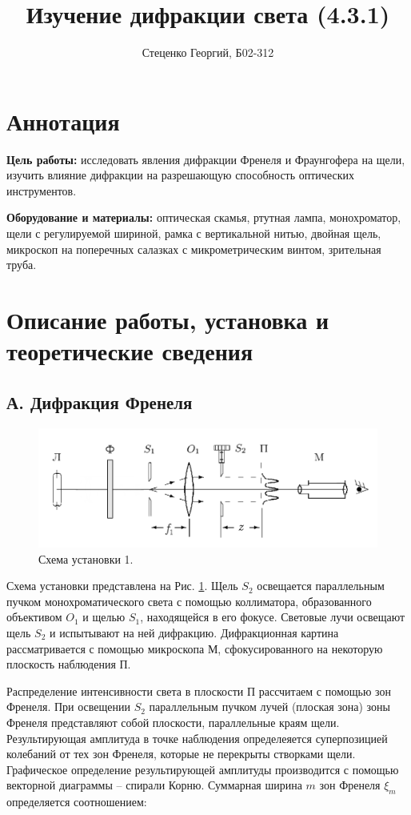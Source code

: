 \documentclass[12pt, a4paper]{article}
\title{Изучение дифракции света (4.3.1)}
\author{Стеценко Георгий, Б02-312}
\date{}
\begin{document}
\maketitle

\section{Аннотация}
\textbf{Цель работы:} исследовать явления дифракции Френеля и Фраунгофера
на щели, изучить влияние дифракции на разрешающую способность оптических
инструментов.

\textbf{Оборудование и материалы:} оптическая скамья, ртутная лампа, монохроматор,
щели с регулируемой шириной, рамка с вертикальной нитью, двойная щель,
микроскоп на поперечных салазках с микрометрическим винтом, зрительная
труба.

\section{Описание работы, установка и теоретические сведения}
\subsection*{А. Дифракция Френеля}
\begin{figure}[h]
  \includegraphics[width=0.7\linewidth]{pics/0.png}
  \centering
  \caption{Схема установки 1.}
  \label{pic:setup-1}
\end{figure}

Схема установки представлена на Рис. \ref{pic:setup-1}.
Щель $S_2$ освещается параллельным пучком монохроматического света с помощью коллиматора,
образованного объективом $O_1$ и щелью $S_1$, находящейся в его фокусе.
Световые лучи освещают щель $S_2$ и испытывают на ней дифракцию.
Дифракционная картина рассматривается с помощью микроскопа М, сфокусированного на
некоторую плоскость наблюдения П.

Распределение интенсивности света в плоскости П рассчитаем с помощью зон Френеля.
При освещении $S_2$ параллельным пучком лучей (плоская зона) зоны Френеля представляют
собой плоскости, параллельные краям щели. Результирующая амплитуда в точке наблюдения
определеяется суперпозицией колебаний от тех зон Френеля, которые не перекрыты створками щели.
Графическое определение результирующей амплитуды производится с помощью векторной
диаграммы -- спирали Корню. Суммарная ширина $m$ зон Френеля $\xi_m$ определяется соотношением:
\end{document}
